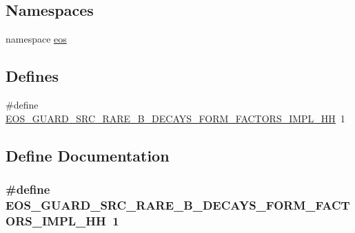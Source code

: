 \subsection*{Namespaces}
\begin{DoxyCompactItemize}
\item 
namespace \hyperlink{namespaceeos}{eos}
\end{DoxyCompactItemize}
\subsection*{Defines}
\begin{DoxyCompactItemize}
\item 
\#define \hyperlink{mesonic-impl_8hh_ac305f5f6cdbb00fc4d4d3e7b1be06724}{EOS\_\-GUARD\_\-SRC\_\-RARE\_\-B\_\-DECAYS\_\-FORM\_\-FACTORS\_\-IMPL\_\-HH}~1
\end{DoxyCompactItemize}


\subsection{Define Documentation}
\hypertarget{mesonic-impl_8hh_ac305f5f6cdbb00fc4d4d3e7b1be06724}{
\subsubsection[{EOS\_\-GUARD\_\-SRC\_\-RARE\_\-B\_\-DECAYS\_\-FORM\_\-FACTORS\_\-IMPL\_\-HH}]{\setlength{\rightskip}{0pt plus 5cm}\#define EOS\_\-GUARD\_\-SRC\_\-RARE\_\-B\_\-DECAYS\_\-FORM\_\-FACTORS\_\-IMPL\_\-HH~1}}
\label{mesonic-impl_8hh_ac305f5f6cdbb00fc4d4d3e7b1be06724}
